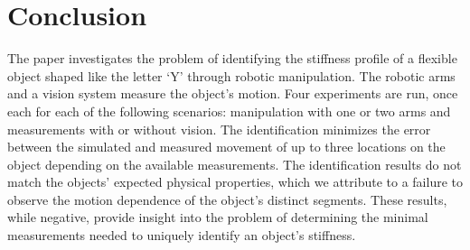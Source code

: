 \documentclass[runningheads,a4paper]{llncs}
\begin{document}
\section{Conclusion}
\label{sec-conc}
The paper investigates the problem of identifying the stiffness profile of a flexible object shaped like the letter `Y' through robotic manipulation. The robotic arms and a vision system measure the object's motion. Four experiments are run, once each for each of the following scenarios: manipulation with one or two arms and measurements with or without vision. The identification minimizes the error between the simulated and measured movement of up to three locations on the object depending on the available measurements. The identification results do not match the objects' expected physical properties, which we attribute to a failure to observe the motion dependence of the object's distinct segments. These results, while negative, provide insight into the problem of determining the minimal measurements needed to uniquely identify an object's stiffness.




\end{document}
